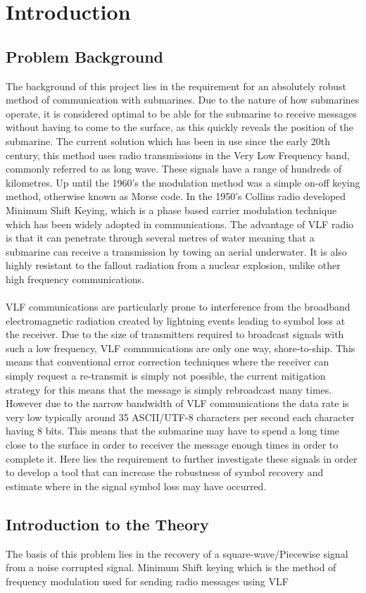 \chapter{Introduction}
\section{Problem Background}
The background of this project lies in the requirement for an absolutely robust method of communication with submarines. Due to the nature of how submarines operate, it is considered optimal to be able for the submarine to receive messages without having to come to the surface, as this quickly reveals the position of the submarine. The current solution which has been in use since the early 20th century, this method uses radio transmissions in the Very Low Frequency band, commonly referred to as long wave. These signals have a range of hundreds of kilometres. Up until the 1960's the modulation method was a simple on-off keying method, otherwise known as Morse code. In the 1950's Collins radio developed Minimum Shift Keying, which is a phase based carrier modulation technique which has been widely adopted in communications. The  advantage of VLF radio is that it can penetrate through several metres of water meaning that a submarine can receive a transmission by towing an aerial underwater. It is also highly resistant to the fallout radiation from a nuclear explosion, unlike other high frequency communications.
\\\\
VLF communications are particularly prone to interference from the broadband electromagnetic radiation created by lightning events leading to symbol loss at the receiver. Due to the size of transmitters required to broadcast signals with such a low frequency, VLF communications are only one way, shore-to-ship. This means that conventional error correction techniques where the receiver can simply request a re-transmit is simply not possible, the current mitigation strategy for this means that the message is simply rebroadcast many times. However due to the narrow bandwidth of VLF communications the data rate is very low typically around 35 ASCII/UTF-8 characters per second each character having 8 bits. This means that the submarine may have to spend a long time close to the surface in order to receiver the message enough times in order to complete it. Here lies the requirement to further investigate these signals in order to develop a tool that can increase the robustness of symbol recovery and estimate where in the signal symbol loss may have occurred.

\section{Introduction to the Theory}
The basis of this problem lies in the recovery of a square-wave/Piecewise signal from a noise corrupted signal. Minimum Shift keying which is the method of frequency modulation used for sending radio messages using VLF
